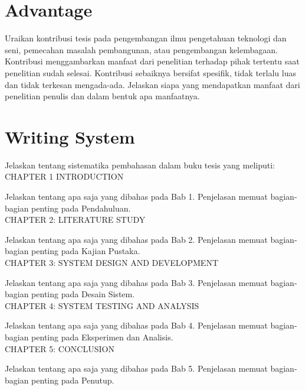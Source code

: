\section{Advantage}
Uraikan kontribusi tesis pada pengembangan ilmu pengetahuan teknologi dan seni, pemecahan masalah pembangunan, atau pengembangan kelembagaan. Kontribusi menggambarkan manfaat dari penelitian terhadap pihak tertentu saat penelitian sudah selesai. Kontribusi sebaiknya bersifat spesifik, tidak terlalu luas dan tidak terkesan mengada-ada. Jelaskan siapa yang mendapatkan manfaat dari penelitian penulis dan dalam bentuk apa manfaatnya.

\section{Writing System}

Jelaskan tentang sistematika pembahasan dalam buku tesis yang meliputi:
\\
CHAPTER 1 INTRODUCTION

Jelaskan tentang apa saja yang dibahas pada Bab 1. Penjelasan memuat bagian-bagian penting pada Pendahuluan.
\\
CHAPTER 2: LITERATURE STUDY

Jelaskan tentang apa saja yang dibahas pada Bab 2. Penjelasan memuat bagian-bagian penting pada Kajian Pustaka.
\\
CHAPTER 3: SYSTEM DESIGN AND DEVELOPMENT

Jelaskan tentang apa saja yang dibahas pada Bab 3. Penjelasan memuat bagian-bagian penting pada Desain Sistem.
\\
CHAPTER 4: SYSTEM TESTING AND ANALYSIS

Jelaskan tentang apa saja yang dibahas pada Bab 4. Penjelasan memuat bagian-bagian penting pada Eksperimen dan Analisis.
\\
CHAPTER 5: CONCLUSION

Jelaskan tentang apa saja yang dibahas pada Bab 5. Penjelasan memuat bagian-bagian penting pada Penutup.

